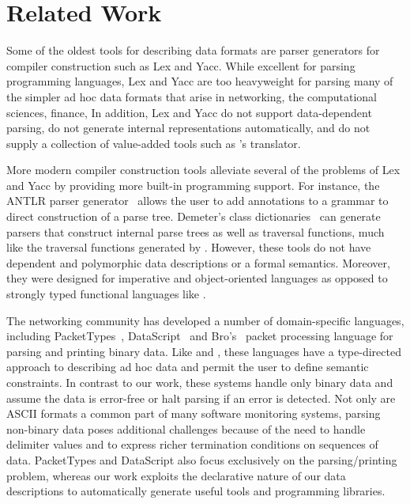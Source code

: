 \section{Related Work}
\label{sec:related}


Some of the oldest tools for describing data formats are parser
generators for compiler construction such as
Lex and Yacc.  While excellent for parsing programming languages, Lex and Yacc
are too heavyweight for parsing many of the simpler ad hoc data formats that
arise in networking, the computational sciences, finance, \etc{}   
In addition, Lex and Yacc do not support data-dependent parsing, 
do not generate internal representations automatically, 
and do not supply a collection of value-added tools such as
\padsml's \xml{} translator.

More modern compiler construction tools alleviate
several of the problems of Lex and Yacc by providing more
built-in programming support.  For instance,
the ANTLR parser generator~\cite{antlr} allows the user to add
annotations to a grammar to direct construction of a parse tree.
Demeter's class dictionaries~\cite{lieberherr+:class-dictionaries}
can generate parsers that construct internal parse trees
as well as traversal functions, much like the traversal functions
generated by \padsml.  However, these tools do not have dependent
and polymorphic data descriptions or a formal semantics.  Moreover,
they were designed for imperative and object-oriented languages 
as opposed to strongly typed functional languages like \ml{}.

The networking community has developed a number of domain-specific
languages, including PacketTypes~\cite{sigcomm00}, DataScript~\cite{gpce02}
and Bro's~\cite{paxson:bro} packet processing language
for parsing and printing binary data.  
Like \padsc{} and \padsml{}, these languages have a type-directed
approach to describing ad hoc data and permit the user to define
semantic constraints.  In contrast to our work, these systems handle
only binary data and assume the data is error-free or halt parsing if
an error is detected.  Not only are ASCII formats a common part of
many software monitoring systems, parsing non-binary data poses additional
challenges because of the need to handle delimiter values and to
express richer termination conditions on sequences of data. 
PacketTypes and DataScript also focus exclusively on the 
parsing/printing problem,
whereas our work exploits the declarative nature of our data
descriptions to automatically generate useful tools and
programming libraries.  

